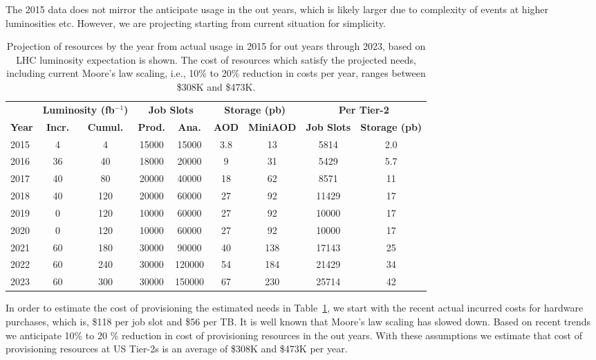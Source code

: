 \documentclass[11pt,a4paper]{article}
\begin{document}
The 2015 data does not mirror the anticipate usage in the out years,
which is likely larger due to complexity of events at higher luminosities
etc.  However, we are projecting starting from current situation for
simplicity.

\begin{table}
\begin{center}
\begin{tabular}{|l|c|c|c|c|c|c|c|c|}
\hline
&\multicolumn{2}{|c|}{\bf Luminosity (fb$^{-1}$)}&\multicolumn{2}{|c|}{\bf Job Slots}&\multicolumn{2}{|c|}{\bf Storage (pb)}&\multicolumn{2}{|c|}{\bf Per Tier-2} \\ \cline{2-9}
{\bf Year}&{\bf Incr.}&{\bf Cumul.}&{\bf Prod.}&{\bf Ana.}&{\bf AOD}&{\bf MiniAOD}&{\bf Job Slots}&{\bf Storage (pb)} \\  \hline
2015&     4&     4& 15000&   15000& 3.8& 13&   5814&   2.0 \\ \hline
2016&   36&   40& 18000&   20000&   9&  31&   5429&   5.7 \\ \hline
2017&   40&   80& 20000&   40000& 18&  62&   8571&  11 \\ \hline
2018&   40& 120& 20000&   60000& 27&  92& 11429&  17 \\ \hline
2019&    0& 120&  10000&   60000& 27&  92& 10000&  17 \\ \hline
2020&    0& 120&  10000&   60000& 27&  92& 10000&  17 \\ \hline
2021&   60& 180& 30000&   90000& 40& 138& 17143& 25 \\ \hline
2022&   60& 240& 30000& 120000& 54& 184& 21429& 34 \\ \hline
2023&   60& 300& 30000& 150000& 67& 230& 25714& 42 \\ \hline
\end{tabular}
\caption[]
{
Projection of resources by the year from actual usage in 2015 for
out years through 2023, based on LHC luminosity expectation is
shown. The cost of resources which satisfy the projected needs, 
including current Moore's law scaling, i.e., 10\% to 20\% reduction 
in costs per year, ranges between \$308K and \$473K.
}
\label{projection}
\end{center}
\end{table}

In order to estimate the cost of provisioning the estimated needs in
Table~\ref{projection}, we start with the recent actual incurred costs 
for hardware purchases, which is, \$118 per job slot and \$56 per TB.
It is well known that Moore's law scaling has slowed down.  Based
on recent trends we anticipate 10\% to 20 \% reduction in cost of
provisioning resources in the out years.  With these assumptions
we estimate that cost of provisioning resources at US Tier-2s
is an average of \$308K and \$473K per year. 
\end{document}
